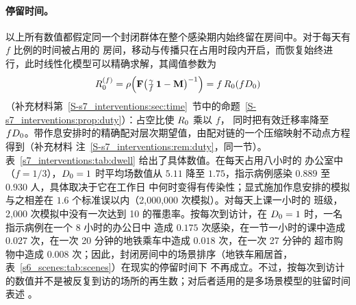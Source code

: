 \paragraph{停留时间。}以上所有数值都假定同一个封闭群体在整个感染期内始终留在房间中。对于每天有 $f$ 比例的时间被占用的
房间，移动与传播只在占用时段内开启，而恢复始终进行，此时线性化模型可以精确求解，其阈值参数为
\begin{equation}\label{s7_interventions:eq:duty}
  R_0^{(f)}=\rho\Bigl(\mathbf{F}\bigl(\tfrac{\gamma}{f}\,\mathbf{1}-\mathbf{M}\bigr)^{-1}\Bigr)=f\,R_0(fD_0)
\end{equation}
（补充材料第~\ref{S-s7_interventions:sec:time}~节中的命题~\ref{S-s7_interventions:prop:duty}）：占空比使 $R_0$ 乘以 $f$，
同时把有效迁移率降至 $fD_0$。带作息安排时的精确配对层次期望值，由配对链的一个压缩映射不动点方程得到（补充材料
注~\ref{S-s7_interventions:rem:duty}，同一节）。表~\ref{s7_interventions:tab:dwell} 给出了具体数值。在每天占用八小时的
办公室中（$f=1/3$），$D_0=1$ 时平均场数值从 $5.11$ 降至 $1.75$，指示病例感染 $0.889$ 至 $0.930$ 人，具体取决于它在工作日
中何时变得有传染性；显式施加作息安排的模拟与之相差在 $1.6$ 个标准误以内（2{,}000{,}000 次模拟）。对每天上课一小时的
班级，2{,}000 次模拟中没有一次达到 10\pct{} 的罹患率。按每次到访计，在 $D_0=1$ 时，一名指示病例在一个 8 小时的办公日中
造成 $0.175$ 次感染，在一节一小时的课中造成 $0.027$ 次，在一次 20 分钟的地铁乘车中造成 $0.018$ 次，在一次 27 分钟的
超市购物中造成 $0.008$ 次；因此，封闭房间中的场景排序（地铁车厢居首，表~\ref{s6_scenes:tab:scenes}）在现实的停留时间下
不再成立。不过，按每次到访计的数值并不是被反复到访的场所的再生数；对后者适用的是多场景模型的驻留时间表述
\citep{bichara2015sis}。

